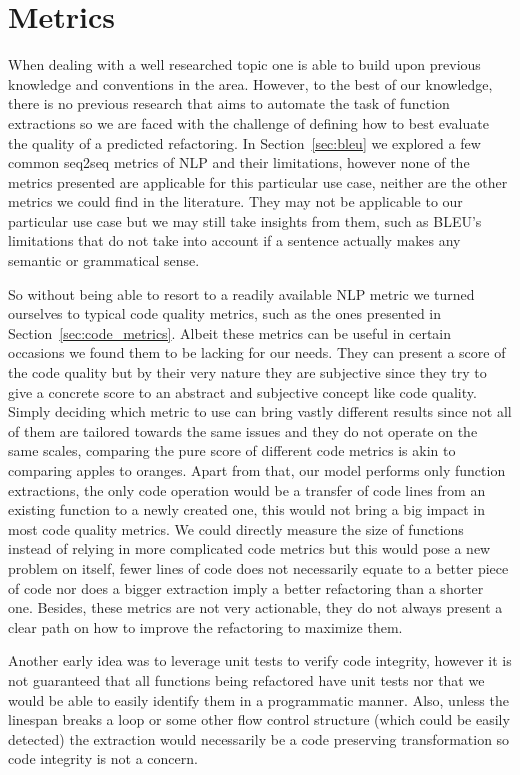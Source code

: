\section{Metrics}

When dealing with a well researched topic one is able to build upon previous knowledge and conventions in the area. However, to the best of our knowledge, there is no previous research that aims to automate the task of function extractions so we are faced with the challenge of defining how to best evaluate the quality of a predicted refactoring. In Section~\ref{sec:bleu} we explored a few common seq2seq metrics of NLP and their limitations, however none of the metrics presented are applicable for this particular use case, neither are the other metrics we could find in the literature. They may not be applicable to our particular use case but we may still take insights from them, such as BLEU's limitations that do not take into account if a sentence actually makes any semantic or grammatical sense. 

So without being able to resort to a readily available NLP metric we turned ourselves to typical code quality metrics, such as the ones presented in Section~\ref{sec:code_metrics}. Albeit these metrics can be useful in certain occasions we found them to be lacking for our needs. They can present a score of the code quality but by their very nature they are subjective since they try to give a concrete score to an abstract and subjective concept like code quality. Simply deciding which metric to use can bring vastly different results since not all of them are tailored towards the same issues and they do not operate on the same scales, comparing the pure score of different code metrics is akin to comparing apples to oranges.
Apart from that, our model performs only function extractions, the only code operation would be a transfer of code lines from an existing function to a newly created one, this would not bring a big impact in most code quality metrics. We could directly measure the size of functions instead of relying in more complicated code metrics but this would pose a new problem on itself, fewer lines of code does not necessarily equate to a better piece of code nor does a bigger extraction imply a better refactoring than a shorter one.
Besides, these metrics are not very actionable, they do not always present a clear path on how to improve the refactoring to maximize them.


Another early idea was to leverage unit tests to verify code integrity, however it is not guaranteed that all functions being refactored have unit tests nor that we would be able to easily identify them in a programmatic manner. Also, unless the linespan breaks a loop or some other flow control structure (which could be easily detected) the extraction would necessarily be a code preserving transformation so code integrity is not a concern.

